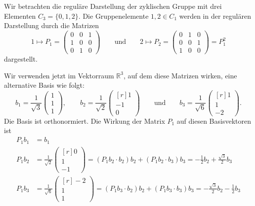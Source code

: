 \begin{beispiel}
\label{buch:gruppen:darstellung:bsp:c3}
Wir betrachten die reguläre Darstellung der zyklischen Gruppe mit
drei Elementen $C_3=\{0,1,2\}$.
Die Gruppenelemente $1,2\in C_1$ werden in der regulären Darstellung
durch die Matrizen
\[
1\mapsto
P_1=
\begin{pmatrix}
0&0&1\\
1&0&0\\
0&1&0
\end{pmatrix}
\qquad\text{und}\qquad
2\mapsto
P_2
=
\begin{pmatrix}
0&1&0\\
0&0&1\\
1&0&0
\end{pmatrix}
=
P_1^2
\]
dargestellt.

Wir verwenden jetzt im Vektorraum $\mathbb{R}^3$, auf dem diese Matrizen
wirken, eine alternative Basis wie folgt:
\[
b_1
=
\frac{1}{\!\sqrt{3}}
\begin{pmatrix}1\\1\\1\end{pmatrix}
,
\qquad
b_2
=
\frac{1}{\!\sqrt{2}}
\begin{pmatrix*}[r]1 \\ -1 \\ 0\end{pmatrix*}
\qquad\text{und}\qquad
b_3
=
\frac{1}{\!\sqrt{6}}
\begin{pmatrix*}[r] 1\\1\\-2\end{pmatrix*}.
\]
Die Basis ist orthonormiert.
Die Wirkung der Matrix $P_1$ auf diesen Basisvektoren ist
\begin{align*}
P_1b_1
&=
b_1\\
P_1b_2
&=
\frac{1}{\!\sqrt{2}}
\begin{pmatrix*}[r]
0\\1\\-1
\end{pmatrix*}
=
(P_1b_2\cdot b_2) b_2
+
(P_1b_2\cdot b_3) b_3
=
-\frac{1}{2}
b_2
+
\frac{\!\sqrt{3}}{2}
b_3
\\
P_1b_3
&=
\frac{1}{\!\sqrt{6}}
\begin{pmatrix*}[r]
-2\\ 1\\1
\end{pmatrix*}
=
(P_1b_3\cdot b_2) b_2
+
(P_1b_3\cdot b_3) b_3
=
-\frac{\!\sqrt{3}}{2}
b_2
-
\frac{1}{2}
b_3
\end{align*}

\end{beispiel}
